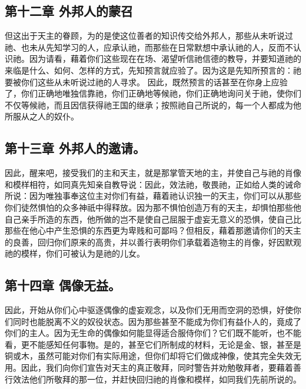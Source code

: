 
\subsection{第十二章 外邦人的蒙召}

但这出于天主的眷顾，为的是使这位善者的知识传交给外邦人，那些从未听说过祂、也未从先知学习的人，应承认祂，而那些在日常默想中承认祂的人，反而不认识祂。因为请看，藉着你们这些现在在场、渴望听信祂信德的教导，并要知道祂的来临是什么、如何、怎样的方式，先知预言就应验了。因为这是先知所预言的：祂要被你们这些从未听说过祂的人寻求。 因此，既然预言的话甚至在你身上应验了，你们正确地唯独信靠祂，你们正确地等候祂，你们正确地询问关于祂，使你们不仅等候祂，而且因信获得祂王国的继承；按照祂自己所说的，每一个人都成为他所服从之人的奴仆。\par


\subsection{第十三章 外邦人的邀请。}

因此，醒来吧，接受我们的主和天主，就是那掌管天地的主，并使自己与祂的肖像和模样相符，如同真先知亲自教导说：因此，效法祂，敬畏祂，正如给人类的诫命所说：因为唯独事奉这位主对你们有益，藉着祂认识独一的天主，你们可以从那些你们徒然惧怕的众多神祇中得释放。因为那不惧怕创造万有的天主，却惧怕那些他自己亲手所造的东西，他所做的岂不是使自己屈服于虚妄无意义的恐惧，使自己比那些在他心中产生恐惧的东西更为卑贱和可鄙吗？但相反，藉着那邀请你们的天主的良善，回归你们原来的高贵，并以善行表明你们承载着造物主的肖像，好因默观祂的模样，你们可被认为是祂的儿女。\par


\subsection{第十四章 偶像无益。}

因此，开始从你们心中驱逐偶像的虚妄观念，以及你们无用而空洞的恐惧，好使你们同时也能脱离不义的奴役状态。因为那些甚至不能成为你们有益仆人的，竟成了你们的主人。因为无生命的偶像如何能显得适合服侍你们？它们既不能听，也不能看，更不能感知任何事物。是的，甚至它们所制成的材料，无论是金、银，甚至是铜或木，虽然可能对你们有实际用途，但你们却将它们做成神像，使其完全失效无用。因此，我们向你们宣告对天主的真正敬拜，同时警告并劝勉敬拜者，要藉着善行效法他们所敬拜的那一位，并赶快回归祂的肖像和模样，如同我们先前所说的。\par

